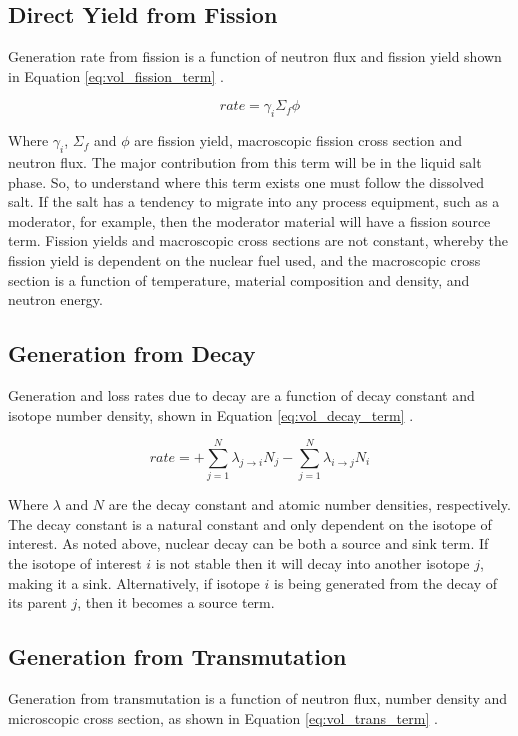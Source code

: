 \subsection{Direct Yield from Fission}
Generation rate from fission is a function of neutron flux and fission yield shown in Equation \ref{eq:vol_fission_term} \cite{houtzeel1967}.

\begin{equation}
	rate = \gamma_{i}\Sigma_{f}\phi
	\label{eq:vol_fission_term}
\end{equation}

Where $\gamma_{i}$, $\Sigma_{f}$ and $\phi$ are fission yield, macroscopic fission cross section and neutron flux. The major contribution from this term will be in the liquid salt phase. So, to understand where this term exists one must follow the dissolved salt. If the salt has a tendency to migrate into any process equipment, such as a moderator, for example, then the moderator material will have a fission source term. Fission yields and macroscopic cross sections are not constant, whereby the fission yield is dependent on the nuclear fuel used, and the macroscopic cross section is a function of temperature, material composition and density, and neutron energy. 

\subsection{Generation from Decay}
Generation and loss rates due to decay are a function of decay constant and isotope number density, shown in Equation \ref{eq:vol_decay_term} \cite{houtzeel1967}.

\begin{equation}
	rate = + \sum_{j=1}^{N} \lambda_{j\rightarrow i}N_{j} - \sum_{j=1}^{N} \lambda_{i\rightarrow j}N_{i}
	\label{eq:vol_decay_term}
\end{equation}

Where $\lambda$ and $N$ are the decay constant and atomic number densities, respectively. The decay constant is a natural constant and only dependent on the isotope of interest. As noted above, nuclear decay can be both a source and sink term.  If the isotope of interest $i$ is not stable then it will decay into another isotope $j$, making it a sink. Alternatively, if isotope $i$ is being generated from the decay of its parent $j$, then it becomes a source term. 

\subsection{Generation from Transmutation}
Generation from transmutation is a function of neutron flux, number density and microscopic cross section, as shown in Equation \ref{eq:vol_trans_term} \cite{houtzeel1967}.

